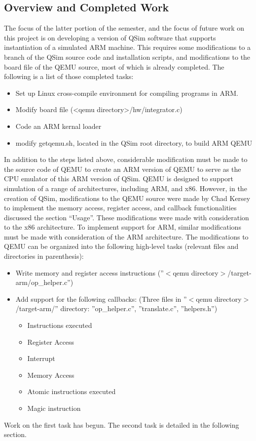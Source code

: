 \documentclass[letterpaper,11pt,twocolumn]{article}
\begin{document}
\subsection{Overview and Completed Work}
The focus of the latter portion of the semester, and the focus of future work on this project is on developing a version of QSim software that supports instantiation of a simulated ARM machine.  This requires some modifications to a branch of the QSim source code and installation scripts, and modifications to the board file of the QEMU source, most of which is already completed. The following is a list of those completed tasks:
\begin{itemize}
  \item{Set up Linux cross-compile environment for compiling programs in ARM.}
  \item{Modify board file (<qemu directory>/hw/integrator.c)}
  \item{Code an ARM kernal loader}
  \item{modify getqemu.sh, located in the QSim root directory, to build ARM QEMU}
\end{itemize}
In addition to the steps listed above, considerable modification must be made to the source code of QEMU to create an ARM version of QEMU to serve as the CPU emulator of this ARM version of QSim. QEMU is designed to support simulation of a range of architectures, including ARM, and x86. However, in the creation of QSim, modifications to the QEMU source were made by Chad Kersey to implement the memory access, register access, and callback functionalities discussed the section “Usage”. These modifications were made with consideration to the x86 architecture. To implement support for ARM, similar modifications must be made with consideration of the ARM architecture.  The modifications to QEMU can be organized into the following high-level tasks (relevant files and directories in parenthesis):
\begin{itemize}
	\item{Write memory and register access instructions (''$<$qemu directory$>$/target-arm/op\_helper.c'')}
	\item{Add support for the following callbacks:
	(Three files in ''$<$qemu directory$>$/target-arm/'' directory: ''op\_helper.c'', ''translate.c'', ''helpers.h'')
		\begin{itemize}
		\item{Instructions executed}
		\item{Register Access}
		\item{Interrupt}
		\item{Memory Access}
		\item{Atomic instructions executed}
		\item{Magic instruction}
		\end{itemize}
	}
\end{itemize}
Work on the first task has begun. The second task is detailed in the following section.
\end{document}
